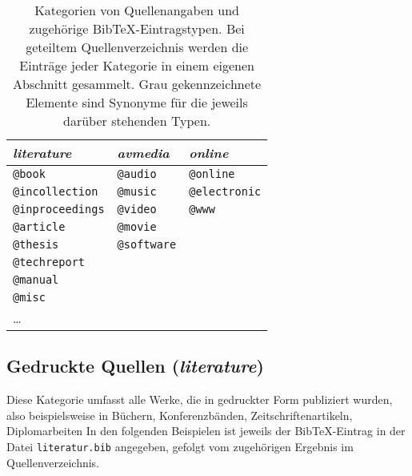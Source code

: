 \begin{table}
\caption{Kategorien von Quellenangaben und zugehörige BibTeX-Eintragstypen.
Bei geteiltem Quellenverzeichnis werden die Einträge jeder Kategorie in einem
eigenen Abschnitt gesammelt.
Grau gekennzeichnete Elemente sind Synonyme für die jeweils darüber stehenden Typen.}
\label{tab:BibKategorien}
\centering
\setlength{\tabcolsep}{6mm}
\begin{tabular}{lll}
	\emph{literature} & \emph{avmedia} & \emph{online} \\
	\hline
	\texttt{@book}          & \texttt{@audio}                & \texttt{@online} \\
	\texttt{@incollection}  & \texttt{\color{midgray}@music} & \texttt{\color{midgray}@electronic} \\
	\texttt{@inproceedings} & \texttt{@video}                & \texttt{\color{midgray}@www} \\
	\texttt{@article}       & \texttt{@movie}                &  \\
	\texttt{@thesis}        & \texttt{@software}             &  \\
	\texttt{@techreport}    &  &  \\
	\texttt{@manual}        &  &  \\
	\texttt{@misc}          &  &  \\
	\ldots                  &  &  \\
	\hline
\end{tabular}
\end{table}


\subsection{Gedruckte Quellen (\emph{literature})}
\label{sec:KategorieLiterature}

Diese Kategorie umfasst alle Werke, die in gedruckter Form publiziert wurden,
also beispielsweise in Büchern, Konferenzbänden, Zeitschriftenartikeln, Diplomarbeiten \usw
In den folgenden Beispielen ist jeweils der BibTeX-Eintrag in der Datei \nolinkurl{literatur.bib}
angegeben, gefolgt vom zugehörigen Ergebnis im Quellenverzeichnis.



